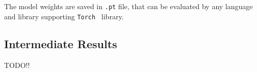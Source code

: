 \documentclass[10pt,twocolumn,letterpaper]{article}
\begin{document}
The model weights are saved in \texttt{.pt} file, that can be evaluated by any language and library supporting \texttt{Torch}~\cite{torchlibrary} library.

\subsection{Intermediate Results}

TODO!!


{
    \small
    
    
}
\end{document}
